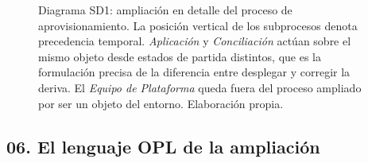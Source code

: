 \documentclass[11pt,letterpaper]{article}
\begin{document}
\begin{figure}[H]
  \caption{Diagrama SD1: ampliación en detalle del proceso de
  aprovisionamiento. La posición vertical de los subprocesos denota
  precedencia temporal. \emph{Aplicación} y \emph{Conciliación} actúan sobre
  el mismo objeto desde estados de partida distintos, que es la formulación
  precisa de la diferencia entre desplegar y corregir la deriva. El
  \emph{Equipo de Plataforma} queda fuera del proceso ampliado por ser un
  objeto del entorno. Elaboración propia.}
  \label{fig:opmsd1}
\end{figure}

\subsection*{06. El lenguaje OPL de la ampliación}
\end{document}

